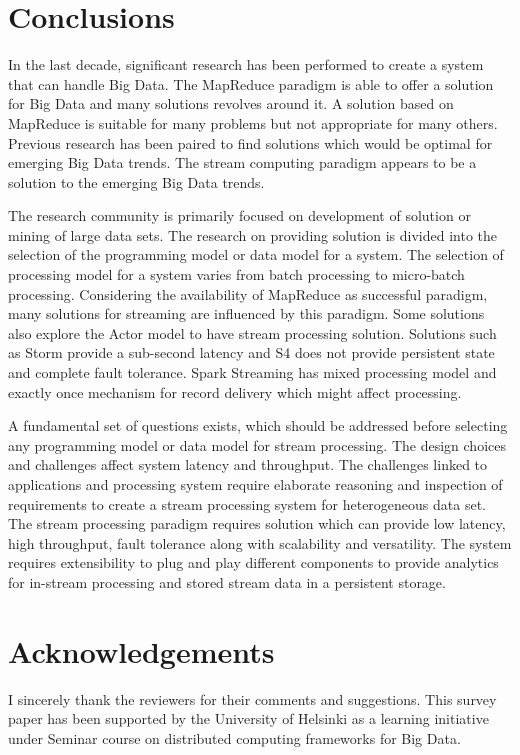 \documentclass{acm_proc_article-sp}
\begin{document}
 




\section{Conclusions}



In the last decade, significant research has been performed to create a system that can handle Big Data. The MapReduce paradigm is able to offer a solution for Big Data and many solutions revolves around it. A solution based on MapReduce is suitable for many problems but not appropriate for many others. Previous research has been paired to find solutions which would be optimal for emerging Big Data trends. The stream computing paradigm appears to be a solution to the emerging Big Data trends. 

The research community is primarily focused on development of solution or mining of large data sets. The research on providing solution is divided into the selection of the programming model or data model for a system. The selection of processing model for a system varies from batch processing to micro-batch processing. Considering the availability of MapReduce as successful paradigm, many solutions for streaming are influenced by this paradigm. Some solutions also explore the Actor model to have stream processing solution. Solutions such as Storm provide a sub-second latency  and S4 does not provide persistent state and complete fault tolerance.  Spark Streaming has mixed processing model and exactly once mechanism for record delivery which might affect processing.  

A fundamental set of questions exists, which should be addressed before selecting any programming model or data model for stream processing. The design choices and challenges affect system latency and throughput. The challenges linked to applications and processing system require elaborate reasoning and inspection of requirements to create a stream processing system for heterogeneous data set. The stream processing paradigm requires solution which can provide  low latency, high throughput, fault tolerance along with scalability and versatility.  The system requires extensibility to plug and play different components to provide analytics for in-stream processing and stored stream data in a persistent storage. 



\section{Acknowledgements} 
I sincerely thank the reviewers for their comments and suggestions. This survey paper has been supported by the University of Helsinki as a learning initiative under Seminar course on distributed computing frameworks for Big Data.



  

\balancecolumns
\end{document}
